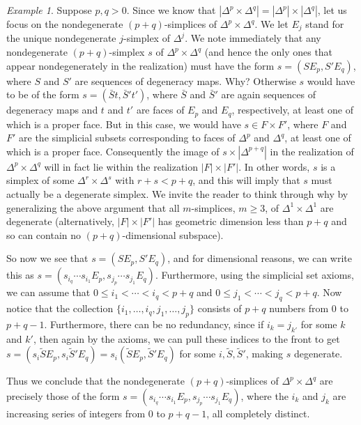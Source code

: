 \documentclass[12pt]{article}
\theoremstyle{plain}
\theoremstyle{definition}
\theoremstyle{remark}
\newtheorem{example}[theorem]{Example}
\newcommand{\td}[1]{\tilde{#1}}
\begin{document}
\begin{example}\label{E: prism}
Suppose $p,q>0$. 
Since we know that $|\Delta^p\times \Delta^q|=|\Delta^p|\times |\Delta^q|$, let us focus on the nondegenerate $(p+q)$-simplices  of $\Delta^p\times \Delta^q$. We let $E_j$ stand for the unique nondegenerate $j$-simplex of $\Delta^j$. We note immediately that any nondegenerate $(p+q)$-simplex $s$ of $\Delta^p\times \Delta^q$ (and hence the only ones that appear nondegenerately in the realization) must have the form $s=(SE_p, S'E_q)$, where $S$ and $S'$ are sequences of degeneracy maps. Why? Otherwise $s$ would have to be of the form  $s=(\bar St, \bar S't')$, where $\bar S$ and $\bar S'$ are again sequences of degeneracy maps and $t$ and $t'$ are faces of $E_p$ and $E_q$, respectively, at least one of which is a proper face. But in this case, we would have $s\in F\times F'$, where $F$ and $F'$ are the simplicial subsets corresponding to faces of $\Delta^p$ and $\Delta^q$, at least one of which is a proper face. Consequently the image of $s\times |\Delta^{p+q}|$ in the realization of $\Delta^p\times \Delta^q$ will in fact lie within the realization $|F|\times |F'|$. In other words, $s$ is a simplex of some $\Delta^r\times \Delta^s$ with $r+s<p+q$, and this will imply that $s$ must actually be a degenerate simplex.  We invite the reader to think through why by generalizing the above argument that all $m$-simplices, $m\geq 3$, of $\Delta^1\times \Delta^1$ are degenerate (alternatively, $|F|\times |F'|$ has geometric dimension less than $p+q$ and so can contain no $(p+q)$-dimensional subspace).

So now we see that  $s=(SE_p, S'E_q)$, and for dimensional reasons, we can write this as $s=(s_{i_q}\cdots s_{i_{1}}E_p, s_{j_p}\cdots s_{j_{1}}E_q)$. Furthermore, using the simplicial set axioms, we can assume that $0\leq i_1< \cdots < i_q< p+q$ and $0\leq j_1< \cdots <j_q< p+q$. Now notice that the collection $\{i_1,\ldots, i_q,j_1,\ldots, j_p\}$ consists of $p+q$ numbers from $0$ to $p+q-1$. Furthermore, there can be no redundancy, since if $i_k=j_{k'}$ for some $k$ and $k'$, then again by the axioms, we can pull these indices to the front to get $s=(s_{i}\td S E_p,s_{i}\td S'E_q)=s_{i}(\td S E_p,\td S'E_q)$ for some $i, \td S,\td S'$, making $s$ degenerate. 

Thus we conclude that the nondegenerate $(p+q)$-simplices of $\Delta^p\times \Delta^q$ are precisely those of the form $s=(s_{i_q}\cdots s_{i_{1}}E_p, s_{j_p}\cdots s_{j_{1}}E_q)$, where the $i_k$ and $j_k$ are increasing series of integers from $0$ to $p+q-1$, all completely distinct.


\end{example}
\end{document}
